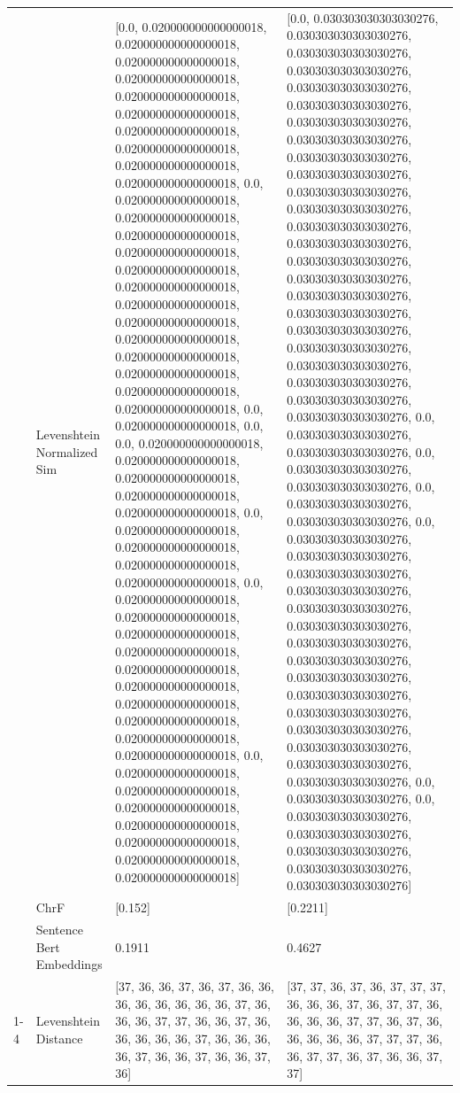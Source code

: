 \begin{tabular}{llll}
 & Levenshtein Normalized Sim & [0.0, 0.020000000000000018, 0.020000000000000018, 0.020000000000000018, 0.020000000000000018, 0.020000000000000018, 0.020000000000000018, 0.020000000000000018, 0.020000000000000018, 0.020000000000000018, 0.020000000000000018, 0.0, 0.020000000000000018, 0.020000000000000018, 0.020000000000000018, 0.020000000000000018, 0.020000000000000018, 0.020000000000000018, 0.020000000000000018, 0.020000000000000018, 0.020000000000000018, 0.020000000000000018, 0.020000000000000018, 0.020000000000000018, 0.020000000000000018, 0.0, 0.020000000000000018, 0.0, 0.0, 0.020000000000000018, 0.020000000000000018, 0.020000000000000018, 0.020000000000000018, 0.020000000000000018, 0.0, 0.020000000000000018, 0.020000000000000018, 0.020000000000000018, 0.020000000000000018, 0.0, 0.020000000000000018, 0.020000000000000018, 0.020000000000000018, 0.020000000000000018, 0.020000000000000018, 0.020000000000000018, 0.020000000000000018, 0.020000000000000018, 0.020000000000000018, 0.020000000000000018, 0.0, 0.020000000000000018, 0.020000000000000018, 0.020000000000000018, 0.020000000000000018, 0.020000000000000018, 0.020000000000000018, 0.020000000000000018] & [0.0, 0.030303030303030276, 0.030303030303030276, 0.030303030303030276, 0.030303030303030276, 0.030303030303030276, 0.030303030303030276, 0.030303030303030276, 0.030303030303030276, 0.030303030303030276, 0.030303030303030276, 0.030303030303030276, 0.030303030303030276, 0.030303030303030276, 0.030303030303030276, 0.030303030303030276, 0.030303030303030276, 0.030303030303030276, 0.030303030303030276, 0.030303030303030276, 0.030303030303030276, 0.030303030303030276, 0.030303030303030276, 0.030303030303030276, 0.030303030303030276, 0.0, 0.030303030303030276, 0.030303030303030276, 0.0, 0.030303030303030276, 0.030303030303030276, 0.0, 0.030303030303030276, 0.030303030303030276, 0.0, 0.030303030303030276, 0.030303030303030276, 0.030303030303030276, 0.030303030303030276, 0.030303030303030276, 0.030303030303030276, 0.030303030303030276, 0.030303030303030276, 0.030303030303030276, 0.030303030303030276, 0.030303030303030276, 0.030303030303030276, 0.030303030303030276, 0.030303030303030276, 0.030303030303030276, 0.0, 0.030303030303030276, 0.0, 0.030303030303030276, 0.030303030303030276, 0.030303030303030276, 0.030303030303030276, 0.030303030303030276] \\
 & ChrF & [0.152] & [0.2211] \\
 & Sentence Bert Embeddings & 0.1911 & 0.4627 \\
\cline{1-4}
\multirow[t]{4}{*}{Lubaale mbeera nga ne mbiro kwotadde.} & Levenshtein Distance & [37, 36, 36, 37, 36, 37, 36, 36, 36, 36, 36, 36, 36, 36, 37, 36, 36, 36, 37, 37, 36, 36, 37, 36, 36, 36, 36, 36, 37, 36, 36, 36, 36, 37, 36, 36, 37, 36, 36, 37, 36] & [37, 37, 36, 37, 36, 37, 37, 37, 36, 36, 36, 37, 36, 37, 37, 36, 36, 36, 36, 37, 37, 36, 37, 36, 36, 36, 36, 36, 37, 37, 37, 36, 36, 37, 37, 36, 37, 36, 36, 37, 37] \\

\end{tabular}
